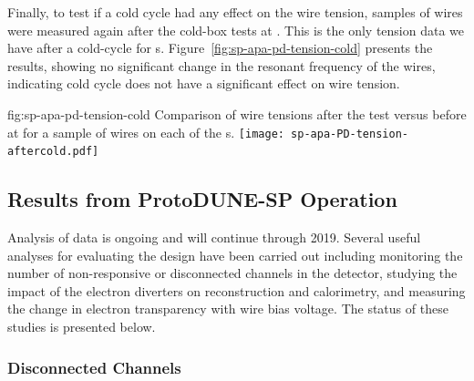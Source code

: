 Finally, to test if a cold cycle had any effect on the wire tension, samples of wires were measured again after the cold-box tests at . This is the only tension data we have after a cold-cycle for  s. Figure~\ref{fig:sp-apa-pd-tension-cold} presents the results, showing no significant change in the resonant frequency of the wires, indicating cold cycle does not have a significant effect on wire tension.

\begin{dunefigure}{fig:sp-apa-pd-tension-cold}
{Comparison of wire tensions after the \coldbox test versus before at  for a sample of wires on each of the  s.}
\texttt{[image: sp-apa-PD-tension-aftercold.pdf]} 
\end{dunefigure}

\subsection{Results from ProtoDUNE-SP Operation}
\label{sec:fdsp-apa-qa-protodune-ops}


Analysis of  data is ongoing and will continue through 2019.  Several useful analyses for evaluating the  design have been carried out including monitoring the number of non-responsive or disconnected channels in the detector, studying the impact of the electron diverters on reconstruction and calorimetry, and measuring the change in electron transparency with wire bias voltage.  The status of these studies is presented below.   


\subsubsection{Disconnected Channels}
\label{sec:fdsp-apa-qa-protodune-ops-dead-channels}

